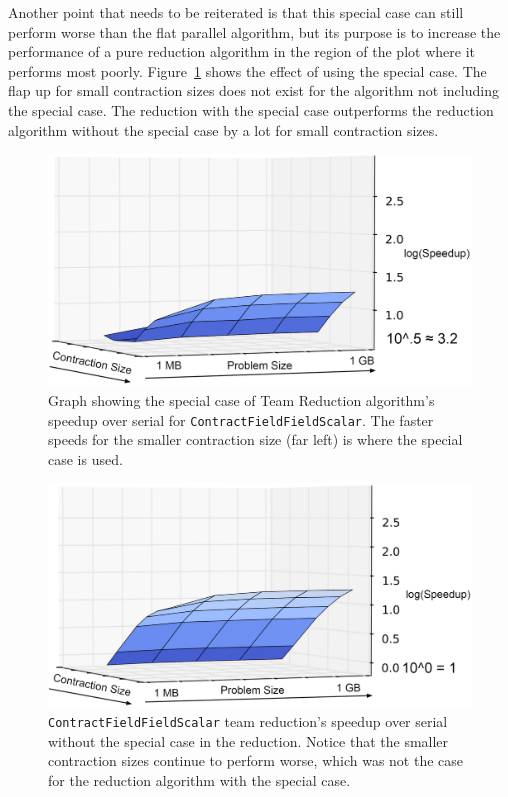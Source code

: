 Another point that needs to be reiterated is that this special case can still
perform worse than the flat parallel algorithm, but its purpose is to increase
the performance of a pure reduction algorithm in the region of the plot where it performs most poorly. Figure~\ref{CFFSTeamReduceSpecialCaseGraph} shows the effect of using the
special case. The flap up for small contraction sizes does not
exist for the algorithm not including the special case. The reduction with the special case outperforms the reduction algorithm without the special case by a lot for 
small contraction sizes.

\begin{figure}
    \centering
\includegraphics[width=5in]{ReductionSpecial2.png}
\caption[\texttt{ContractFieldFieldScalar} reduction special]{Graph showing the
    special case of Team Reduction algorithm's speedup over serial for
    \texttt{ContractFieldFieldScalar}.  The faster speeds for the smaller
contraction size (far left) is where the special case is used.}
\label{CFFSTeamReduceSpecialCaseGraph}
\end{figure}

\begin{figure}
    \centering
\includegraphics[width=5in]{ReductionNoSpecial2.png}
\caption[\texttt{ContractFieldFieldScalar} reduction no special]{\texttt{ContractFieldFieldScalar} team reduction's speedup
        over serial without the special case in the reduction. Notice that the
    smaller contraction sizes continue to perform worse, which was not the case
for the reduction algorithm with the special case.}
\label{CFFSTeamReduceNoSpecialCaseGraph}
\end{figure}

